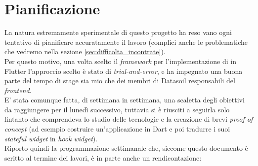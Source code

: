 \section{Pianificazione}
La natura estremamente sperimentale di questo progetto ha reso vano ogni tentativo di pianificare accuratamente il lavoro (complici anche le problematiche che vedremo nella sezione \ref{sec:difficolta_incontrate}).\\
Per questo motivo, una volta scelto il \textit{framework} per l'implementazione di \asa{} in Flutter l'approccio scelto è stato di \textit{trial-and-error}, e ha impegnato una buona parte del tempo di stage sia mio che dei membri di Datasoil responsabili del \textit{frontend}.\\
E' stata comunque fatta, di settimana in settimana, una scaletta degli obiettivi da raggiungere per il lunedì successivo, tuttavia si è riusciti a seguirla solo fintanto che comprendeva lo studio delle tecnologie e la creazione di brevi \textit{proof of concept} (ad esempio costruire un'applicazione in Dart e poi tradurre i suoi \textit{stateful widget} in \textit{hook widget}).\\
Riporto quindi la programmazione settimanale che, siccome questo documento è scritto al termine dei lavori, è in parte anche un rendicontazione:

